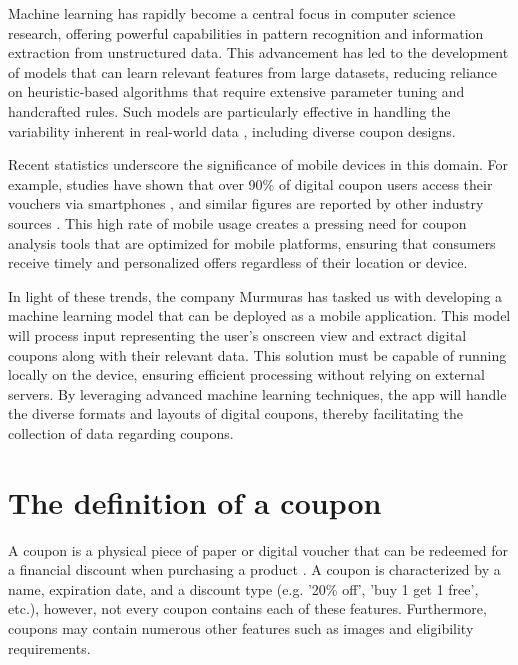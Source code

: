 \documentclass[licencjacka,en]{docs/pracamgr}
\begin{document}
Machine learning has rapidly become a central focus in computer science research, offering powerful capabilities in pattern recognition and information extraction from unstructured data. This advancement has led to the development of models that can learn relevant features from large datasets, reducing reliance on heuristic-based algorithms that require extensive parameter tuning and handcrafted rules. Such models are particularly effective in handling the variability inherent in real-world data \cite{ml_general}, including diverse coupon designs.

Recent statistics underscore the significance of mobile devices in this domain. For example, studies have shown that over 90\% of digital coupon users access their vouchers via smartphones \cite{emarketer_coupon_stats}, and similar figures are reported by other industry sources \cite{voucherify_coupon_stats}. This high rate of mobile usage creates a pressing need for coupon analysis tools that are optimized for mobile platforms, ensuring that consumers receive timely and personalized offers regardless of their location or device.

In light of these trends, the company Murmuras has tasked us with developing a machine learning model that can be deployed as a mobile application. This model will process input representing the user's onscreen view and extract digital coupons along with their relevant data. This solution must be capable of running locally on the device, ensuring efficient processing without relying on external servers. By leveraging advanced machine learning techniques, the app will handle the diverse formats and layouts of digital coupons, thereby facilitating the collection of data regarding coupons.

\section{The definition of a coupon} 
A coupon is a physical piece of paper or digital voucher that can be redeemed for a financial discount when purchasing a product \cite{coupon_definition}. A coupon is characterized by a name, expiration date, and a discount type (e.g. '20\% off', 'buy 1 get 1 free', etc.), however, not every coupon contains each of these features. Furthermore, coupons may contain numerous other features such as images and eligibility requirements. 
\end{document}
